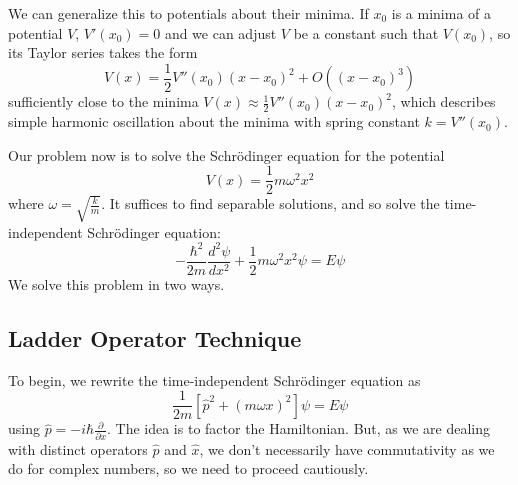 \documentclass[12pt, a4paper, oneside, openright, titlepage]{book}
\begin{document}
We can generalize this to potentials about their minima. If $x_0$ is a minima of a potential $V$, $V'(x_0) = 0$ and we can adjust $V$ be a constant such that $V(x_0)$, so its Taylor series takes the form $$V(x) = \frac{1}{2}V''(x_0)(x-x_0)^2 + O((x-x_0)^3)$$
sufficiently close to the minima $V(x) \approx \frac{1}{2}V''(x_0)(x-x_0)^2$, which describes simple harmonic oscillation about the minima with spring constant $k = V''(x_0)$. 

Our problem now is to solve the Schr\"{o}dinger equation for the potential $$V(x) = \frac{1}{2}m\omega^2x^2$$
where $\omega = \sqrt{\frac{k}{m}}$. It suffices to find separable solutions, and so solve the time-independent Schr\"{o}dinger equation: $$-\frac{\hbar^2}{2m}\frac{d^2\psi}{dx^2} + \frac{1}{2}m\omega^2x^2\psi = E\psi$$
We solve this problem in two ways.

\subsection{Ladder Operator Technique}

To begin, we rewrite the time-independent Schr\"{o}dinger equation as $$\frac{1}{2m}\left[\hat{p}^2 + (m\omega x)^2\right]\psi = E\psi$$
using $\hat{p} = -i\hbar\frac{\partial}{\partial x}$. The idea is to factor the Hamiltonian. But, as we are dealing with distinct operators $\hat{p}$ and $\hat{x}$, we don't necessarily have commutativity as we do for complex numbers, so we need to proceed cautiously. 
\end{document}
